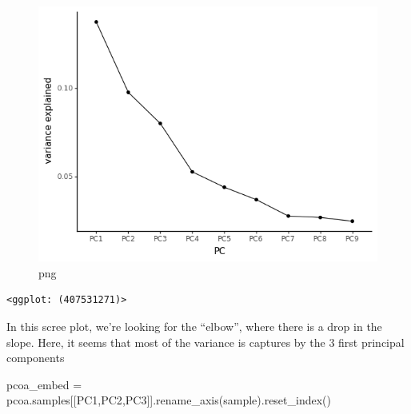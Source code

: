 \documentclass[
  letterpaper,
]{book}
\newenvironment{Shaded}{}{}
\newcommand{\NormalTok}[1]{\textcolor[rgb]{0.14,0.16,0.18}{#1}}
\newcommand{\OperatorTok}[1]{\textcolor[rgb]{0.14,0.16,0.18}{#1}}
\newcommand{\StringTok}[1]{\textcolor[rgb]{0.01,0.18,0.38}{#1}}
\begin{document}
\begin{figure}

{\centering \includegraphics{assets/images/chapters/taxonomic-profiling/analysis_102_0.png}

}

\caption{png}

\end{figure}

\begin{verbatim}
<ggplot: (407531271)>
\end{verbatim}

In this scree plot, we're looking for the ``elbow'', where there is a
drop in the slope. Here, it seems that most of the variance is captures
by the 3 first principal components

\begin{Shaded}
\begin{Highlighting}[]
\NormalTok{pcoa\_embed }\OperatorTok{=}\NormalTok{ pcoa.samples[[}\StringTok{\textquotesingle{}PC1\textquotesingle{}}\NormalTok{,}\StringTok{\textquotesingle{}PC2\textquotesingle{}}\NormalTok{,}\StringTok{\textquotesingle{}PC3\textquotesingle{}}\NormalTok{]].rename\_axis(}\StringTok{\textquotesingle{}sample\textquotesingle{}}\NormalTok{).reset\_index()}
\end{Highlighting}
\end{Shaded}
\end{document}
